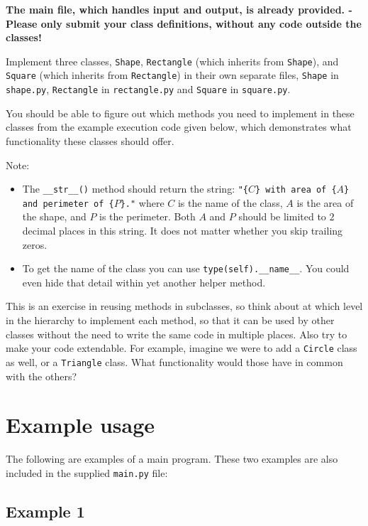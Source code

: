 
\textbf{The main file, which handles input and output, is already provided. -
Please only submit your class definitions, without any code outside the classes!}

Implement three classes,
\texttt{Shape},
\texttt{Rectangle} (which inherits from \texttt{Shape}),
and \texttt{Square} (which inherits from \texttt{Rectangle})
in their own separate files,
\texttt{Shape} in \texttt{shape.py},
\texttt{Rectangle} in \texttt{rectangle.py}
and \texttt{Square} in \texttt{square.py}.

You should be able to figure out
which methods you need to implement in these classes
from the example execution code given below,
which demonstrates what functionality these classes should offer.

Note:
\begin{itemize}
    \item
    The \texttt{\_\_str\_\_()} method should return the string:
	\texttt{"\{$C$\} with area of \{$A$\} and perimeter of \{$P$\}."}
	where $C$ is the name of the class,
	$A$ is the area of the shape,
	and $P$ is the perimeter.
	Both $A$ and $P$ should be limited to $2$ decimal places in this string.
	It does not matter whether you skip trailing zeros.

	\item
	To get the name of the class
	you can use \texttt{type(self).\_\_name\_\_}.
	You could even hide that detail within yet another helper method.
\end{itemize}

This is an exercise in reusing methods in subclasses,
so think about at which level in the hierarchy to implement each method,
so that it can be used by other classes
without the need to write the same code in multiple places.
Also try to make your code extendable.
For example, imagine we were to add a \texttt{Circle} class as well,
or a \texttt{Triangle} class.
What functionality would those have in common with the others?

\section*{Example usage}

The following are examples of a main program.
These two examples are also included in the supplied \texttt{main.py} file:

\subsection*{Example 1}

